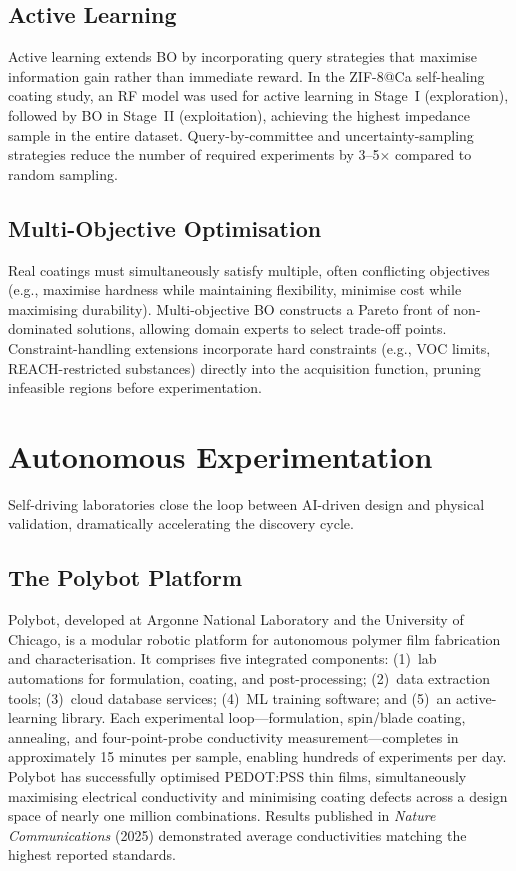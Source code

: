 \documentclass[11pt,a4paper]{article}
\begin{document}
\subsection{Active Learning}

Active learning extends BO by incorporating query strategies that maximise information gain rather than immediate reward.
In the ZIF-8@Ca self-healing coating study, an RF model was used for active learning in Stage~I (exploration), followed by BO in Stage~II (exploitation), achieving the highest impedance sample in the entire dataset.
Query-by-committee and uncertainty-sampling strategies reduce the number of required experiments by 3--5$\times$ compared to random sampling.

\subsection{Multi-Objective Optimisation}

Real coatings must simultaneously satisfy multiple, often conflicting objectives (e.g., maximise hardness while maintaining flexibility, minimise cost while maximising durability).
Multi-objective BO constructs a Pareto front of non-dominated solutions, allowing domain experts to select trade-off points.
Constraint-handling extensions incorporate hard constraints (e.g., VOC limits, REACH-restricted substances) directly into the acquisition function, pruning infeasible regions before experimentation.

\section{Autonomous Experimentation}
\label{sec:autonomous}

Self-driving laboratories close the loop between AI-driven design and physical validation, dramatically accelerating the discovery cycle.

\subsection{The Polybot Platform}

Polybot, developed at Argonne National Laboratory and the University of Chicago, is a modular robotic platform for autonomous polymer film fabrication and characterisation.
It comprises five integrated components: (1)~lab automations for formulation, coating, and post-processing; (2)~data extraction tools; (3)~cloud database services; (4)~ML training software; and (5)~an active-learning library.
Each experimental loop---formulation, spin/blade coating, annealing, and four-point-probe conductivity measurement---completes in approximately 15 minutes per sample, enabling hundreds of experiments per day.
Polybot has successfully optimised PEDOT:PSS thin films, simultaneously maximising electrical conductivity and minimising coating defects across a design space of nearly one million combinations.
Results published in \textit{Nature Communications} (2025) demonstrated average conductivities matching the highest reported standards.
\end{document}
